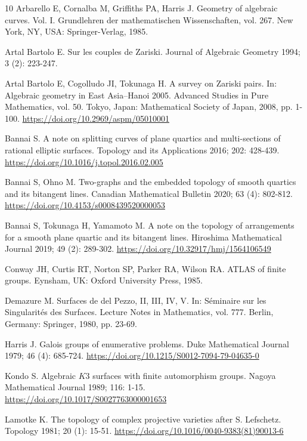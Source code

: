 \documentclass{math}
\theoremstyle{plain}
\numberwithin{equation}{section}
\begin{document}
\begin{thebibliography}{10}
Arbarello E, Cornalba M, Griffiths PA, Harris J.
Geometry of algebraic curves. Vol. I. Grundlehren der mathematischen Wissenschaften, vol. 267.
New York, NY, USA: Springer-Verlag, 1985.

Artal Bartolo E.
Sur les couples de Zariski.
Journal of Algebraic Geometry 1994; 3 (2): 223-247.

Artal Bartolo E, Cogolludo JI, Tokunaga H.
A survey on Zariski pairs.
In: Algebraic geometry in East Asia--Hanoi 2005.
Advanced Studies in Pure Mathematics, vol. 50.
Tokyo, Japan: Mathematical Society of Japan, 2008, pp. 1-100.
\url{https://doi.org/10.2969/aspm/05010001}

Bannai S.
A note on splitting curves of plane quartics and multi-sections of rational elliptic surfaces.
Topology and its Applications 2016; 202: 428-439.
\url{https://doi.org/10.1016/j.topol.2016.02.005}

Bannai S, Ohno M.
Two-graphs and the embedded topology of smooth quartics and its bitangent lines.
Canadian Mathematical Bulletin 2020; 63 (4): 802-812.
\url{https://doi.org/10.4153/s0008439520000053}

Bannai S, Tokunaga H, Yamamoto M.
A note on the topology of arrangements for a smooth plane quartic and its bitangent lines.
Hiroshima Mathematical Journal 2019; 49 (2): 289-302.
\url{https://doi.org/10.32917/hmj/1564106549}

Conway JH, Curtis RT, Norton SP, Parker RA, Wilson RA.
ATLAS of finite groups.
Eynsham, UK: Oxford University Press, 1985.

Demazure M.
Surfaces de del Pezzo, II, III, IV, V.
In: Séminaire sur les Singularités des Surfaces.
Lecture Notes in Mathematics, vol. 777.
Berlin, Germany: Springer, 1980, pp. 23-69.

Harris J.
Galois groups of enumerative problems.
Duke Mathematical Journal 1979; 46 (4): 685-724.
\url{https://doi.org/10.1215/S0012-7094-79-04635-0}

Kondo S.
Algebraic $K3$ surfaces with finite automorphism groups.
Nagoya Mathematical Journal 1989; 116: 1-15.
\url{https://doi.org/10.1017/S0027763000001653}

Lamotke K.
The topology of complex projective varieties after S. Lefschetz.
Topology 1981; 20 (1): 15-51.
\url{https://doi.org/10.1016/0040-9383(81)90013-6}


\end{thebibliography}
\end{document}
